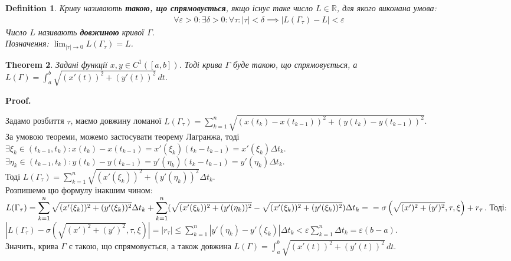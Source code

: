 \documentclass[a4paper, 10pt]{article}
\makeatletter
\def\huge{\displaystyle}
\theoremstyle{theoremdd}
\newtheorem{theorem}{Theorem}[subsection]
\theoremstyle{theoremdd}
\theoremstyle{theoremdd}
\newtheorem{definition}[theorem]{Definition}
\theoremstyle{theoremdd}
\theoremstyle{theoremdd}
\theoremstyle{theoremdd}
\theoremstyle{theoremdd}
\theoremstyle{theoremdd}
\theoremstyle{theoremdd}
\renewenvironment{proof}[1][Proof.\\]{\par
\pushQED{\hfill \qed}%
\normalfont \topsep6\p@\@plus6\p@\relax
\trivlist
\item\relax
{\bfseries
#1\@addpunct{.}}\hspace\labelsep\ignorespaces
}{%
\popQED\endtrivlist\@endpefalse
}
\makeatother
\begin{document}
\begin{definition}
Криву називають \textbf{такою, що спрямовується}, якщо існує таке число $L \in \mathbb{R}$, для якого виконана умова:
\begin{align*}
\forall \varepsilon > 0: \exists \delta > 0: \forall \tau: |\tau| < \delta \implies |L(\Gamma_\tau) -L| < \varepsilon
\end{align*}
Число $L$ називають \textbf{довжиною} кривої $\Gamma$.\\
Позначення: $\huge\lim_{|\tau| \to 0} L(\Gamma_\tau) = L$. 
\end{definition}

\begin{theorem}
Задані функції $x,y \in C^1([a,b])$. Тоді крива $\Gamma$ буде такою, що спрямовується, а $L(\Gamma) = \huge\int_a^b \sqrt{(x'(t))^2 + (y'(t))^2}\,dt$.
\end{theorem}

\begin{proof}
Задамо розбиття $\tau$, маємо довжину ломаної $L(\Gamma_{\tau}) = \huge\sum_{k=1}^n \sqrt{(x(t_{k})-x(t_{k-1}))^2 + (y(t_{k})-y(t_{k-1}))^2}$.\\
За умовою теореми, можемо застосувати теорему Лагранжа, тоді\\
$\exists \xi_k \in (t_{k-1},t_k): x(t_{k})-x(t_{k-1}) = x'(\xi_k) (t_{k}-t_{k-1}) = x'(\xi_k) \Delta t_k$.\\
$\exists \eta_k \in (t_{k-1},t_k): y(t_{k})-y(t_{k-1}) = y'(\eta_k) (t_k-t_{k-1}) = y'(\eta_k) \Delta t_k$.\\
Тоді $L(\Gamma_\tau) = \huge\sum_{k=1}^n \sqrt{(x'(\xi_k))^2 + (y'(\eta_k))^2} \Delta t_k$.\\
Розпишемо цю формулу інакшим чином:\\
$L(\Gamma_\tau) = \huge\sum_{k=1}^n \sqrt{(x'(\xi_k))^2 + (y'(\xi_k))^2} \Delta t_k + \huge\sum_{k=1}^n (\sqrt{(x'(\xi_k))^2 + (y'(\eta_k))^2} - \sqrt{(x'(\xi_k))^2 + (y'(\xi_k))^2}) \Delta t_k = \\ = \sigma \left(\sqrt{(x')^2+(y')^2}, \tau, \xi \right) + r_\tau$. Тоді:\\
$|L(\Gamma_\tau) - \sigma \left(\sqrt{(x')^2+(y')^2}, \tau, \xi \right)| = |r_\tau| \leq \huge\sum_{k=1}^n |y'(\eta_k) - y'(\xi_k)| \Delta t_k < \varepsilon \huge\sum_{k=1}^n \Delta t_k = \varepsilon (b-a)$.\\
Значить, крива $\Gamma$ є такою, що спрямовується, а також довжина
$L(\Gamma) = \huge\int_a^b \sqrt{(x'(t))^2 + (y'(t))^2}\,dt$.
\end{proof}
\end{document}
